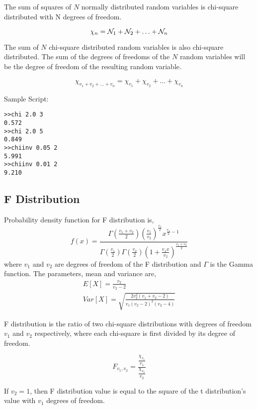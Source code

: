 \documentclass[a4paper,12pt]{book}
\begin{document}
The sum of squares of $N$ normally distributed random variables is chi-square distributed with N degrees of freedom. 

\begin{equation}
\chi_n = {\cal N}_1 + {\cal N}_2 + \ldots + {\cal N}_n
\end{equation}

The sum of $N$ chi-square distributed random variables is also chi-square distributed. The sum of the degrees of freedoms of the $N$ random variables will be the degree of freedom of the resulting random variable.

\begin{equation}
\chi_{v_1 + v_2 + \ldots + v_n} = \chi_{v_1} + \chi_{v_2} + \ldots + \chi_{v_n}
\end{equation}

Sample Script:
\begin{verbatim}
>>chi 2.0 3
0.572
>>chi 2.0 5
0.849
>>chiinv 0.05 2
5.991
>>chiinv 0.01 2
9.210
\end{verbatim}

\subsection{F Distribution}
Probability density function for F distribution is,
\begin{equation}
f(x)=\frac{\Gamma(\frac{v_1+v_2}{2})(\frac{v_1}{v_2})^{\frac{v_1}{2}}x^{{\frac{v_1}{2}}-1}}{\Gamma(\frac{v_1}{2})\Gamma(\frac{v_2}{2})(1+\frac{v_1x}{v_2})^{\frac{v_1+v_2}{2}}}
\end{equation}
where $v_1$ and $v_2$ are degrees of freedom of the F distribution and $\Gamma$ is the Gamma function. The parameters, mean and variance are,
\begin{eqnarray}
E[X]=\frac{v_2}{v_2-2} \nonumber \\
Var[X]=\sqrt{\frac{2v_2^2(v_1+v_2-2)}{v_1(v_2-2)^2(v_2-4)}}
\end{eqnarray}

F distribution is the ratio of two chi-square distributions with degrees of freedom $v_1$ and $v_2$ respectively, where each chi-square is first divided by its degree of freedom.

\begin{equation}
F_{v_1, v_2} = \frac{\frac{\chi_{v_1}}{v_1}}{\frac{\chi_{v_2}}{v_2}}
\end{equation}

If $v_2=1$, then F distribution value is equal to the square of the t distribution's value with $v_1$ degrees of freedom.
\end{document}
